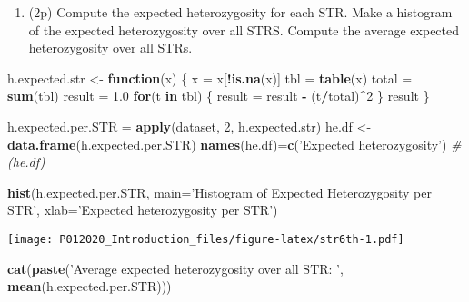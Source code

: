 \documentclass[
]{article}
\newenvironment{Shaded}{\begin{snugshade}}{\end{snugshade}}
\newcommand{\CommentTok}[1]{\textcolor[rgb]{0.56,0.35,0.01}{\textit{#1}}}
\newcommand{\ControlFlowTok}[1]{\textcolor[rgb]{0.13,0.29,0.53}{\textbf{#1}}}
\newcommand{\DataTypeTok}[1]{\textcolor[rgb]{0.13,0.29,0.53}{#1}}
\newcommand{\DecValTok}[1]{\textcolor[rgb]{0.00,0.00,0.81}{#1}}
\newcommand{\FloatTok}[1]{\textcolor[rgb]{0.00,0.00,0.81}{#1}}
\newcommand{\KeywordTok}[1]{\textcolor[rgb]{0.13,0.29,0.53}{\textbf{#1}}}
\newcommand{\NormalTok}[1]{#1}
\newcommand{\OperatorTok}[1]{\textcolor[rgb]{0.81,0.36,0.00}{\textbf{#1}}}
\newcommand{\StringTok}[1]{\textcolor[rgb]{0.31,0.60,0.02}{#1}}
\providecommand{\tightlist}{%
  \setlength{\itemsep}{0pt}\setlength{\parskip}{0pt}}
\begin{document}
\begin{enumerate}
\def\labelenumi{\arabic{enumi}.}
\setcounter{enumi}{5}
\tightlist
\item
  (2p) Compute the expected heterozygosity for each STR. Make a
  histogram of the expected heterozygosity over all STRS. Compute the
  average expected heterozygosity over all STRs.
\end{enumerate}

\begin{Shaded}
\begin{Highlighting}[]
\NormalTok{h.expected.str <-}\StringTok{ }\ControlFlowTok{function}\NormalTok{(x) \{}
\NormalTok{  x =}\StringTok{ }\NormalTok{x[}\OperatorTok{!}\KeywordTok{is.na}\NormalTok{(x)]}
\NormalTok{  tbl =}\StringTok{ }\KeywordTok{table}\NormalTok{(x)}
\NormalTok{  total =}\StringTok{ }\KeywordTok{sum}\NormalTok{(tbl)}
\NormalTok{  result =}\StringTok{ }\FloatTok{1.0}
  \ControlFlowTok{for}\NormalTok{(t }\ControlFlowTok{in}\NormalTok{ tbl) \{}
\NormalTok{    result =}\StringTok{ }\NormalTok{result }\OperatorTok{-}\StringTok{ }\NormalTok{(t}\OperatorTok{/}\NormalTok{total)}\OperatorTok{^}\DecValTok{2}
\NormalTok{  \}}
\NormalTok{  result}
\NormalTok{\}}


\NormalTok{h.expected.per.STR =}\StringTok{ }\KeywordTok{apply}\NormalTok{(dataset, }\DecValTok{2}\NormalTok{, h.expected.str)}
\NormalTok{he.df <-}\StringTok{ }\KeywordTok{data.frame}\NormalTok{(h.expected.per.STR)}
\KeywordTok{names}\NormalTok{(he.df)=}\KeywordTok{c}\NormalTok{(}\StringTok{'Expected heterozygosity'}\NormalTok{)}
\CommentTok{#(he.df)}


\KeywordTok{hist}\NormalTok{(h.expected.per.STR, }\DataTypeTok{main=}\StringTok{'Histogram of Expected Heterozygosity per STR'}\NormalTok{, }\DataTypeTok{xlab=}\StringTok{'Expected heterozygosity per STR'}\NormalTok{)}
\end{Highlighting}
\end{Shaded}

\texttt{[image: P012020\_Introduction\_files/figure-latex/str6th-1.pdf]}

\begin{Shaded}
\begin{Highlighting}[]
\KeywordTok{cat}\NormalTok{(}\KeywordTok{paste}\NormalTok{(}\StringTok{'Average expected heterozygosity over all STR: '}\NormalTok{, }\KeywordTok{mean}\NormalTok{(h.expected.per.STR)))}
\end{Highlighting}
\end{Shaded}
\end{document}
